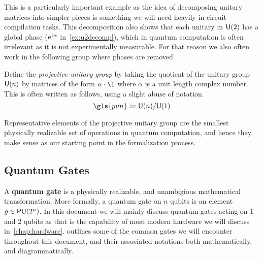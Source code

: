 This is a particularly important example as the idea of decomposing unitary matrices into simpler pieces is something we will need heavily in circuit compilation tasks.
This decomposition also shows that each unitary in $\mathsf{U} (2)$ has a global phase ($\mathrm{e}^{\mkern1mu\mathrm{i}\mkern1mu\alpha}$ in~\cref{ex:u2decomp}), which in quantum computation is often irrelevant as it is not experimentally measurable.
For that reason we also often work in the following group where phases are removed.
\begin{definition}
    Define the \emph{projective unitary group} by taking the quotient of the unitary group $\mathsf{U} (n)$ by matrices of the form $\alpha \cdot \1$ where $\alpha$ is a unit length complex number.
    This is often written as follows, using a slight abuse of notation.
    \begin{equation}
        \gls{pun} \defeq \U{n} / \U{1}
    \end{equation}
\end{definition}
Representative elements of the projective unitary group are the smallest physically realizable set of operations in quantum computation, and hence they make sense as our starting point in the formalization process.

\subsection{Quantum Gates}

A \textbf{quantum gate} is a physically realizable, and unambigious mathematical transformation.
More formally, a quantum gate on $n$ qubits is an element $g \in \mathsf{PU} (2^n)$.
In this document we will mainly discuss quantum gates acting on 1 and 2 qubits as that is the capability of most modern hardware we will discuss in~\cref{chap:hardware}.
 outlines some of the common gates we will encounter throughout this document, and their associated notations both mathematically, and diagrammatically.

